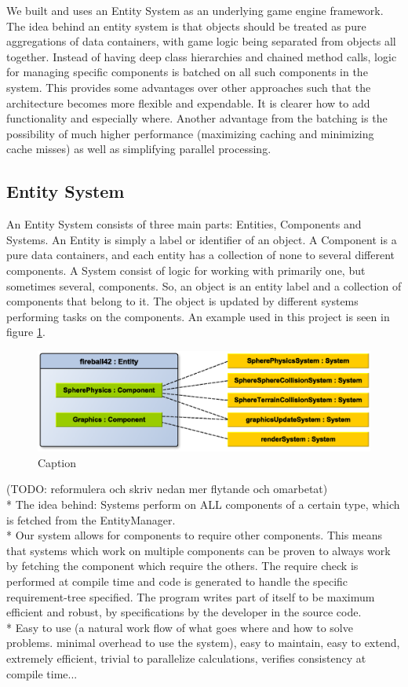 We built and uses an Entity System as an underlying game engine framework.
The idea behind an entity system is that objects should be treated as pure aggregations of data containers, with game logic being separated from objects all together. Instead of having deep class hierarchies and chained method calls, logic for managing specific components is batched on all such components in the system. This provides some advantages over other approaches such that the architecture becomes more flexible and expendable. It is clearer how to add functionality and especially where. Another advantage from the batching is the possibility of much higher performance (maximizing caching and minimizing cache misses) as well as simplifying parallel processing.

\subsection{Entity System}
An Entity System consists of three main parts: Entities, Components and Systems.
An Entity is simply a label or identifier of an object. A Component is a pure data containers, and each entity has a collection of none to several different components. A System consist of logic for working with primarily one, but sometimes several, components. So, an object is an entity label and a collection of components that belong to it. The object is updated by different systems performing tasks on the components. An example used in this project is seen in figure \ref{fig:EntityComponentSystemExample}.
\begin{figure}[H]
  \centering
  \includegraphics[width=0.9\linewidth]{images/EntityComponentSystemExample.eps}
  \caption{Caption}
  \label{fig:EntityComponentSystemExample}
\end{figure}
(TODO: reformulera och skriv nedan mer flytande och omarbetat)\\
* The idea behind: Systems perform on ALL components of a certain type, which is fetched from the EntityManager.\\
* Our system allows for components to require other components. This means that systems which work on multiple components can be proven to always work by fetching the component which require the others. The require check is performed at compile time and code is generated to handle the specific requirement-tree specified. The program writes part of itself to be maximum efficient and robust, by specifications by the developer in the source code.\\
* Easy to use (a natural work flow of what goes where and how to solve problems. minimal overhead to use the system), easy to maintain, easy to extend, extremely efficient, trivial to parallelize calculations, verifies consistency at compile time...


